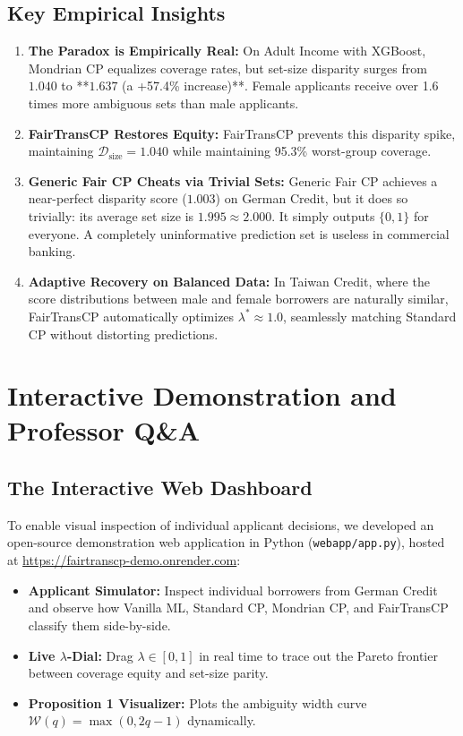 \documentclass[11pt,a4paper]{article}
\begin{document}
\subsection{Key Empirical Insights}
\begin{enumerate}[leftmargin=1.5em, itemsep=3pt]
    \item \textbf{The Paradox is Empirically Real:} On Adult Income with XGBoost, Mondrian CP equalizes coverage rates, but set-size disparity surges from $1.040$ to **$1.637$ (a +57.4\% increase)**. Female applicants receive over 1.6 times more ambiguous sets than male applicants.
    \item \textbf{FairTransCP Restores Equity:} FairTransCP prevents this disparity spike, maintaining $\mathcal{D}_{\text{size}} = 1.040$ while maintaining 95.3\% worst-group coverage.
    \item \textbf{Generic Fair CP Cheats via Trivial Sets:} Generic Fair CP achieves a near-perfect disparity score ($1.003$) on German Credit, but it does so trivially: its average set size is $1.995 \approx 2.000$. It simply outputs $\{0, 1\}$ for everyone. A completely uninformative prediction set is useless in commercial banking.
    \item \textbf{Adaptive Recovery on Balanced Data:} In Taiwan Credit, where the score distributions between male and female borrowers are naturally similar, FairTransCP automatically optimizes $\lambda^* \approx 1.0$, seamlessly matching Standard CP without distorting predictions.
\end{enumerate}

\section{Interactive Demonstration and Professor Q\&A}

\subsection{The Interactive Web Dashboard}
To enable visual inspection of individual applicant decisions, we developed an open-source demonstration web application in Python (\texttt{webapp/app.py}), hosted at \url{https://fairtranscp-demo.onrender.com}:
\begin{itemize}[leftmargin=1.5em, itemsep=2pt]
    \item \textbf{Applicant Simulator:} Inspect individual borrowers from German Credit and observe how Vanilla ML, Standard CP, Mondrian CP, and FairTransCP classify them side-by-side.
    \item \textbf{Live $\lambda$-Dial:} Drag $\lambda \in [0, 1]$ in real time to trace out the Pareto frontier between coverage equity and set-size parity.
    \item \textbf{Proposition 1 Visualizer:} Plots the ambiguity width curve $\mathcal{W}(q) = \max(0, 2q-1)$ dynamically.
\end{itemize}
\end{document}
